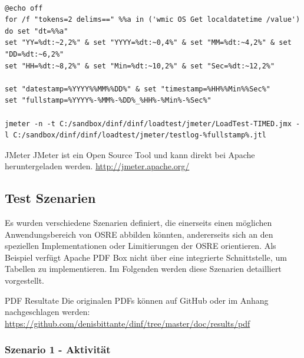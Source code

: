 \documentclass[main.tex]{subfiles}
\begin{document}
\begin{lstlisting}[language=command.com]

@echo off
for /f "tokens=2 delims==" %%a in ('wmic OS Get localdatetime /value') do set "dt=%%a"
set "YY=%dt:~2,2%" & set "YYYY=%dt:~0,4%" & set "MM=%dt:~4,2%" & set "DD=%dt:~6,2%"
set "HH=%dt:~8,2%" & set "Min=%dt:~10,2%" & set "Sec=%dt:~12,2%"

set "datestamp=%YYYY%%MM%%DD%" & set "timestamp=%HH%%Min%%Sec%"
set "fullstamp=%YYYY%-%MM%-%DD%_%HH%-%Min%-%Sec%"

jmeter -n -t C:/sandbox/dinf/dinf/loadtest/jmeter/LoadTest-TIMED.jmx -l C:/sandbox/dinf/dinf/loadtest/jmeter/testlog-%fullstamp%.jtl

\end{lstlisting}




\begin{reference}{JMeter}
JMeter ist ein Open Source Tool und kann direkt bei Apache heruntergeladen werden. \newline
\url{http://jmeter.apache.org/}
\end{reference}



\subsection{Test Szenarien}
Es wurden verschiedene Szenarien definiert, die einerseits einen möglichen Anwendungsbereich von OSRE abbilden könnten, andererseits sich an den speziellen Implementationen oder Limitierungen der OSRE orientieren. Als Beispiel verfügt Apache PDF Box nicht über eine integrierte Schnittstelle, um Tabellen zu implementieren. Im Folgenden werden diese Szenarien detailliert vorgestellt. 


\begin{reference}{PDF Resultate}
 Die originalen PDFs können auf GitHub oder im Anhang nachgeschlagen werden: \url{https://github.com/denisbittante/dinf/tree/master/doc/results/pdf}
 
\end{reference}

\subsubsection{Szenario 1 - Aktivität}
\end{document}
